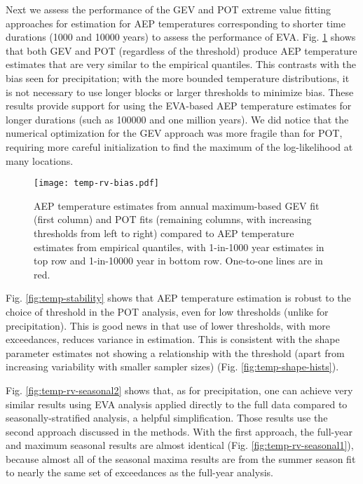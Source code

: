 \documentclass{ametsocV6.1}
\begin{document}
Next we assess the performance of the GEV and POT extreme value fitting approaches for estimation for AEP temperatures corresponding to shorter time durations (1000 and 10000 years) to assess the performance of EVA. Fig. \ref{fig:temp-rv-bias} shows that both GEV and POT (regardless of the threshold) produce AEP temperature estimates that are very similar to the empirical quantiles. This contrasts with the bias seen for precipitation; with the more bounded temperature distributions, it is not necessary to use longer blocks or larger thresholds to minimize bias. These results provide support for using the EVA-based AEP temperature estimates for longer durations (such as 100000 and one million years). We did notice that the numerical optimization for the GEV approach was more fragile than for POT, requiring more careful initialization to find the maximum of the log-likelihood at many locations.

\begin{figure}
    \centering
    \texttt{[image: temp-rv-bias.pdf]}
    \caption{AEP temperature estimates from annual maximum-based GEV fit (first column) and POT fits (remaining columns, with increasing thresholds from left to right) compared to AEP temperature estimates from empirical quantiles, with 1-in-1000 year estimates in top row and 1-in-10000 year in bottom row. One-to-one lines are in red.}
    \label{fig:temp-rv-bias}
\end{figure}

Fig. \ref{fig:temp-stability} shows that AEP temperature estimation is robust to the choice of threshold in the POT analysis, even for low thresholds (unlike for precipitation). This is good news in that use of lower thresholds, with more exceedances, reduces variance in estimation. This is consistent with the shape parameter estimates not showing a relationship with the threshold (apart from increasing variability with smaller sampler sizes) (Fig. \ref{fig:temp-shape-hists}).

Fig. \ref{fig:temp-rv-seasonal2} shows that, as for precipitation, one can achieve very similar results using EVA analysis applied directly to the full data compared to seasonally-stratified analysis, a helpful simplification. Those results use the second approach discussed in the methods. With the first approach, the full-year and maximum seasonal results are almost identical (Fig. \ref{fig:temp-rv-seasonal1}), because almost all of the seasonal maxima results are from the summer season fit to nearly the same set of exceedances as the full-year analysis.
\end{document}
